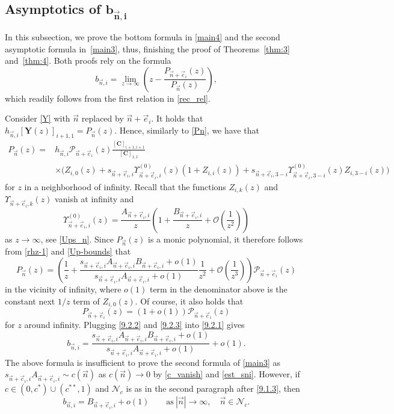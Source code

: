 \documentclass[10pt,a4paper]{amsart}
\numberwithin{equation}{section}
\newcommand{\n}{{\vec n}}
\begin{document}
\subsection[Asymptotics of b\_n,i]{Asymptotics of $\boldsymbol{b_{\n,i} }$}

In this subsection, we prove the bottom formula in \eqref{main4} and the second asymptotic formula in~\eqref{main3}, thus, finishing the proof of Theorems~\ref{thm:3} and~\ref{thm:4}. Both proofs rely on the formula
\begin{equation}
\label{9.2.1}
b_{\n,i} = \lim_{z\to\infty} \left( z - \frac{P_{\n+\vec e_i}(z)}{P_\n(z)} \right),
\end{equation}
which readily follows from the first relation in \eqref{rec_rel}.

Consider \eqref{Y} with $ \n $ replaced by $ \n+\vec e_i $. It holds that $ h_{\n,i}[\boldsymbol Y(z)]_{i+1,1} = P_\n(z) $. Hence, similarly to \eqref{Pn}, we have that
\begin{align*}
P_\n(z) ={}& h_{\n,i} \mathcal P_{\n+\vec e_i}(z)\frac{[\boldsymbol C]_{i+1,i+1}}{[\boldsymbol C]_{1,1}} \\
&\times\bigl( Z_{i,0}(z) + s_{\n+\vec e_i,i}\Upsilon_{\n+\vec e_i,i}^{(0)}(z)(1+Z_{i,i}(z)) + s_{\n+\vec e_i,3-i}\Upsilon_{\n+\vec e_i,3-i}^{(0)}(z)Z_{i,3-i}(z) \bigr)
\end{align*}
for $ z $ in a neighborhood of infinity. Recall that the functions $ Z_{i,k}(z) $ and $ \Upsilon_{\n+\vec e_i,k}(z) $ vanish at infinity and
\[
\Upsilon_{\n+\vec e_i,i}^{(0)}(z) = \frac{A_{\n+\vec e_i,i}}z\left(1 + \frac{B_{\n+\vec e_i,i}}z + \mathcal O\left(\frac1{z^2}\right) \right)
\]
as $ z\to\infty $, see \eqref{Ups_n}. Since $ P_\n(z) $ is a monic polynomial, it therefore follows from \eqref{rhz-1} and \eqref{Up-bounds} that
\begin{equation}
\label{9.2.2}
P_\n(z) = \left( \frac 1z + \frac{s_{\n+\vec e_i,i}A_{\n+\vec e_i,i}B_{\n+\vec e_i,i}+o(1)}{s_{\n+\vec e_i,i}A_{\n+\vec e_i,i} + o(1)} \frac1{z^2} + \mathcal O\left(\frac1{z^3}\right) \right) \mathcal P_{\n+\vec e_i}(z)
\end{equation}
in the vicinity of infinity, where $ o(1) $ term in the denominator above is the constant next $ 1/z $ term of $ Z_{i,0}(z) $. Of course, it also holds that
\begin{equation}
\label{9.2.3}
P_{\n+\vec e_i}(z) = (1 + o(1) ) \mathcal P_{\n+\vec e_i}(z)
\end{equation}
for $ z $ around infinity. Plugging \eqref{9.2.2} and \eqref{9.2.3} into \eqref{9.2.1} gives
\[
b_{\n,i} = \frac{s_{\n+\vec e_i,i}A_{\n+\vec e_i,i}B_{\n+\vec e_i,i}+o(1)}{s_{\n+\vec e_i,i}A_{\n+\vec e_i,i} + o(1)} + o(1).
\]
The above formula is insufficient to prove the second formula of \eqref{main3} as $ s_{\n+\vec e_i,i}A_{\n+\vec e_i,i} \sim c(\n) $ as $ c(\n) \to 0 $ by \eqref{c_vanish} and \eqref{est_sni}. However, if $ c\in(0,c^*) \cup (c^{**},1) $ and $ \mathcal N_c $ is as in the second paragraph after \eqref{9.1.3}, then
\begin{equation}
\label{9.2.4}
b_{\n,i} = B_{\n+\vec e_i,i}+o(1) \qquad \text{as} \ |\n| \to\infty, \quad \n\in \mathcal N_c.
\end{equation}
\end{document}
